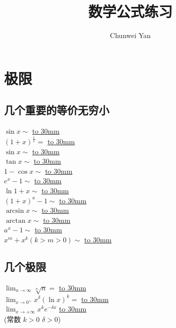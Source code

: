 \documentclass[a4paper]{ctexart}
\author{Chunwei Yan}
\title{数学公式练习}
\begin{document}
    \maketitle

\section{极限}
\subsection{几个重要的等价无穷小}

\begin{multicols}{2}

        $\sin{x}\sim$ 
            \underline{\hbox to 30mm{}} \\
        $(1+x)^\frac{1}{x}=$ 
            \underline{\hbox to 30mm{}} \\
        $\sin{x} \sim$  
            \underline{\hbox to 30mm{}} \\
        $\tan{x} \sim$   
            \underline{\hbox to 30mm{}} \\
        $1 - \cos{x} \sim $         
            \underline{\hbox to 30mm{}} \\
        $e^x - 1 \sim$              
            \underline{\hbox to 30mm{}} \\
        $\ln{1+x} \sim$             
            \underline{\hbox to 30mm{}} \\
        $(1+x)^a - 1 \sim$          
            \underline{\hbox to 30mm{}} \\
        $\arcsin{x} \sim$           
            \underline{\hbox to 30mm{}} \\
        $\arctan{x} \sim$           
            \underline{\hbox to 30mm{}} \\
        $a^x - 1 \sim$              
            \underline{\hbox to 30mm{}} \\
        $x^m + x^k(k>m>0) \sim$       
        \underline{\hbox to 30mm{}} \\

\end{multicols}

\subsection{几个极限}
\begin{multicols}{2}
    $\lim_{n \rightarrow \infty} { \sqrt[n]{n}} =$   
        \underline{\hbox to 30mm{}} \\
    $\lim_{x \rightarrow 0^+}
          { x^\delta(\ln{x})^k }
        =$                                           
        \underline{\hbox to 30mm{}} \\
    $\lim_{x \rightarrow +\infty}
        {
            x^k e^{-\delta x}
        }$                                           
        \underline{\hbox to 30mm{}} \\
        (常数 $k>0$ \quad $\delta >0$)               \\
\end{multicols}
\end{document}
